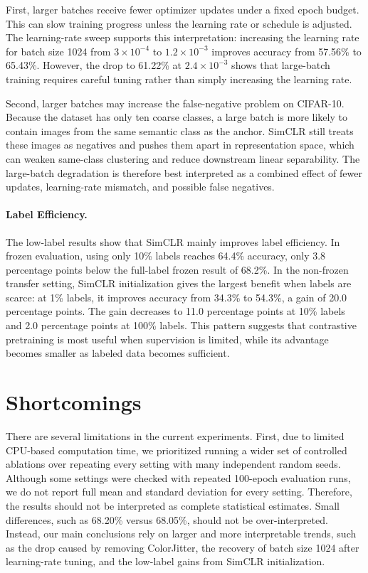 \documentclass[10pt]{article}
\begin{document}
First, larger batches receive fewer optimizer updates under a fixed epoch budget. This can slow training progress unless the learning rate or schedule is adjusted. The learning-rate sweep supports this interpretation: increasing the learning rate for batch size 1024 from $3 \times 10^{-4}$ to $1.2 \times 10^{-3}$ improves accuracy from 57.56\% to 65.43\%. However, the drop to 61.22\% at $2.4 \times 10^{-3}$ shows that large-batch training requires careful tuning rather than simply increasing the learning rate.

Second, larger batches may increase the false-negative problem on CIFAR-10. Because the dataset has only ten coarse classes, a large batch is more likely to contain images from the same semantic class as the anchor. SimCLR still treats these images as negatives and pushes them apart in representation space, which can weaken same-class clustering and reduce downstream linear separability. The large-batch degradation is therefore best interpreted as a combined effect of fewer updates, learning-rate mismatch, and possible false negatives.

\paragraph{Label Efficiency.}
The low-label results show that SimCLR mainly improves label efficiency. In frozen evaluation, using only 10\% labels reaches 64.4\% accuracy, only 3.8 percentage points below the full-label frozen result of 68.2\%. In the non-frozen transfer setting, SimCLR initialization gives the largest benefit when labels are scarce: at 1\% labels, it improves accuracy from 34.3\% to 54.3\%, a gain of 20.0 percentage points. The gain decreases to 11.0 percentage points at 10\% labels and 2.0 percentage points at 100\% labels. This pattern suggests that contrastive pretraining is most useful when supervision is limited, while its advantage becomes smaller as labeled data becomes sufficient.

\section{Shortcomings}

There are several limitations in the current experiments. First, due to limited CPU-based computation time, we prioritized running a wider set of controlled ablations over repeating every setting with many independent random seeds. Although some settings were checked with repeated 100-epoch evaluation runs, we do not report full mean and standard deviation for every setting. Therefore, the results should not be interpreted as complete statistical estimates. Small differences, such as 68.20\% versus 68.05\%, should not be over-interpreted. Instead, our main conclusions rely on larger and more interpretable trends, such as the drop caused by removing ColorJitter, the recovery of batch size 1024 after learning-rate tuning, and the low-label gains from SimCLR initialization.
\end{document}
